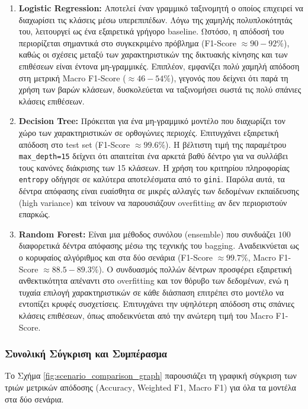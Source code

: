 \documentclass[11pt,a4paper]{article}
\newcommand{\eng}[1]{\textlatin{#1}}
\begin{document}
\begin{enumerate}
    \item \textbf{\eng{Logistic Regression}:} Αποτελεί έναν γραμμικό ταξινομητή ο οποίος επιχειρεί να διαχωρίσει τις κλάσεις μέσω υπερεπιπέδων. Λόγω της χαμηλής πολυπλοκότητάς του, λειτουργεί ως ένα εξαιρετικά γρήγορο \eng{baseline}. Ωστόσο, η απόδοσή του περιορίζεται σημαντικά στο συγκεκριμένο πρόβλημα (\eng{F1-Score} $\approx 90-92\%$), καθώς οι σχέσεις μεταξύ των χαρακτηριστικών της δικτυακής κίνησης και των επιθέσεων είναι έντονα μη-γραμμικές. Επιπλέον, εμφανίζει πολύ χαμηλή απόδοση στη μετρική \eng{Macro} \eng{F1-Score} ($\approx 46-54\%$), γεγονός που δείχνει ότι παρά τη χρήση των βαρών κλάσεων, δυσκολεύεται να ταξινομήσει σωστά τις πολύ σπάνιες κλάσεις επιθέσεων.
    
    \item \textbf{\eng{Decision Tree}:} Πρόκειται για ένα μη-γραμμικό μοντέλο που διαχωρίζει τον χώρο των χαρακτηριστικών σε ορθογώνιες περιοχές. Επιτυγχάνει εξαιρετική απόδοση στο \eng{test set} (\eng{F1-Score} $\approx 99.6\%$). Η βέλτιστη τιμή της παραμέτρου \texttt{\eng{max\_depth=15}} δείχνει ότι απαιτείται ένα αρκετά βαθύ δέντρο για να συλλάβει τους κανόνες διάκρισης των 15 κλάσεων. Η χρήση του κριτηρίου πληροφορίας \texttt{\eng{entropy}} οδήγησε σε καλύτερα αποτελέσματα από το \texttt{\eng{gini}}. Παρόλα αυτά, τα δέντρα απόφασης είναι ευαίσθητα σε μικρές αλλαγές των δεδομένων εκπαίδευσης (\eng{high variance}) και τείνουν να παρουσιάζουν \eng{overfitting} αν δεν περιοριστούν επαρκώς.
    
    \item \textbf{\eng{Random Forest}:} Είναι μια μέθοδος συνόλου (\eng{ensemble}) που συνδυάζει $100$ διαφορετικά δέντρα απόφασης μέσω της τεχνικής του \eng{bagging}. Αναδεικνύεται ως ο κορυφαίος αλγόριθμος και στα δύο σενάρια (\eng{F1-Score} $\approx 99.7\%$, \eng{Macro} \eng{F1-Score} $\approx 88.5-89.3\%$). Ο συνδυασμός πολλών δέντρων προσφέρει εξαιρετική ανθεκτικότητα απέναντι στο \eng{overfitting} και τον θόρυβο των δεδομένων, ενώ η τυχαία επιλογή χαρακτηριστικών σε κάθε διάσπαση επιτρέπει στο μοντέλο να εντοπίζει κρυφές συσχετίσεις. Επιτυγχάνει την υψηλότερη απόδοση στις σπάνιες κλάσεις επιθέσεων, όπως αποδεικνύεται από την ανώτερη τιμή του \eng{Macro} \eng{F1-Score}.
\end{enumerate}

\subsubsection{Συνολική Σύγκριση και Συμπέρασμα}
Το Σχήμα \ref{fig:scenario_comparison_graph} παρουσιάζει τη γραφική σύγκριση των τριών μετρικών απόδοσης (\eng{Accuracy}, \eng{Weighted F1}, \eng{Macro F1}) για όλα τα μοντέλα στα δύο σενάρια.
\end{document}
